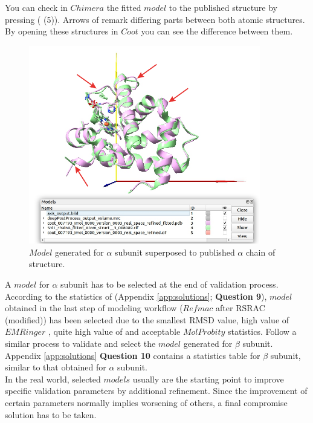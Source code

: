 \begin{itemize}
\begin{itemize}
  You can check in $Chimera$ the fitted $model$ to the published structure by pressing  ( (5)). Arrows of  remark differing parts between both atomic structures. By opening these structures in $Coot$ you can see the difference between them.
 
   \begin{figure}[H]
    \centering 
    \captionsetup{width=.7\linewidth} 
    \includegraphics[width=0.90\textwidth]{Images/Fig38}
    \caption{$Model$ generated for  $\alpha$ subunit superposed to published $\alpha$ chain of  structure.}
    \label{fig:superpose_pdbs_chimera}
   \end{figure}
  
  
  \end{itemize}
 \end{itemize}
 
 A $model$ for  $\alpha$ subunit has to be selected at the end of validation process. According to the statistics of  (Appendix \ref{app:solutions}; \textbf{Question 9}), $model$ obtained in the last step of modeling workflow ($Refmac$ after RSRAC (modified)) has been selected due to the smallest RMSD value, high value of $EMRinger$ , quite high value of \ccmask and acceptable $MolProbity$ statistics. Follow a similar process to validate and select the $model$ generated for  $\beta$ subunit. Appendix \ref{app:solutions} \textbf{Question 10} contains a statistics table for  $\beta$ subunit, similar to that obtained for  $\alpha$ subunit.\\
 
 In the real world, selected $models$ usually are the starting point to improve specific validation parameters by additional refinement. Since the improvement of certain parameters normally implies worsening of others, a final compromise solution has to be taken.\\

